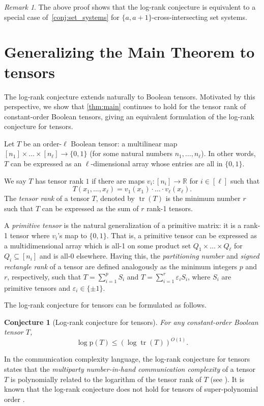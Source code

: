 \documentclass[11pt]{article}
\theoremstyle{plain}
\newtheorem{conjecture}[thm]{Conjecture}
\theoremstyle{remark}
\newtheorem{remark}[thm]{Remark}
\def\p{{\mathrm{p}}}
\DeclareMathOperator{\tr}{tr}
\newcommand{\eps}{\varepsilon}
\newcommand{\R}{\mathbb{R}}
\begin{document}
\begin{remark}
	The above proof shows that the log-rank conjecture is equivalent to a special case of~\cref{conj:set_systems} for $\{a, a+1\}$-cross-intersecting set systems.
\end{remark}


\section{Generalizing the Main Theorem to tensors}\label{sec:tensors}
The log-rank conjecture extends naturally to Boolean tensors. Motivated by this perspective, we show that \cref{thm:main} continues to hold for the tensor rank of constant-order Boolean tensors, giving an equivalent formulation of the log-rank conjecture for tensors.

Let $T$ be an order-$\ell$ Boolean tensor: a multilinear map $[n_1] \times \ldots \times [n_\ell] \to \{0, 1\}$ (for some natural numbers $n_1, \ldots, n_\ell$). In other words, $T$ can be expressed as an $\ell$-dimensional array whose entries are all in $\{0, 1\}$. 

We say $T$ has tensor rank $1$ if there are maps $v_i :[n_i] \to \R$ for $i \in [\ell]$ such that 
\[ T(x_1, \ldots, x_\ell) = v_1(x_1) \cdot \ldots \cdot v_{\ell}(x_{\ell}). \]
The \emph{tensor rank} of a tensor $T$, denoted by $\tr(T)$ is the minimum number $r$ such that $T$ can be expressed as the sum of $r$ rank-1 tensors. 

A \emph{primitive tensor} is the natural generalization of a primitive matrix: it is a rank-1 tensor where $v_i$'s map to $\{0, 1\}$. That is, a primitive tensor can be expressed as a multidimensional array which is all-1 on some product set $Q_1 \times \ldots \times Q_\ell$ for $Q_i \subseteq [n_i]$ and is all-0 elsewhere. Having this, the \emph{partitioning number} and \emph{signed rectangle rank} of a tensor are defined analogously as the minimum integers $p$ and $r$, respectively, such that $T=\sum_{i=1}^p S_i$ and $T=\sum_{i=1}^r \eps_{i} S_i$, where $S_i$ are primitive tensors and $\eps_i \in \{\pm1 \}$. 

The log-rank conjecture for tensors can be formulated as follows.
\begin{conjecture}[Log-rank conjecture for tensors]\label{conj:log-rank-tensors}
	For any constant-order Boolean tensor $T$, \[\log \p(T) \leq (\log \tr(T))^{O(1)}.\]
\end{conjecture}

In the communication complexity language, the log-rank conjecture for tensors states that the \emph{multiparty number-in-hand communication complexity} of a tensor $T$ is polynomially related to the logarithm of the tensor rank of $T$ (see \cite{DKWPartition2011}). It is known that the log-rank conjecture does not hold for tensors of super-polynomial order \cite{li2011applications}.
\end{document}
